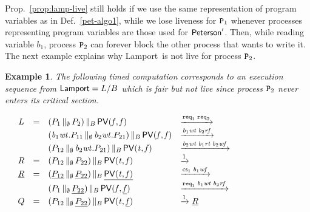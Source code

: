 \documentclass[copyright,creativecommons]{eptcs}
\newenvironment{tracex}{\ccspace{0.15}\noindent}{\ccspace{0.2}}
\newcommand{\ccspace}[1]{\vspace{#1cm}}
\newtheorem{example}[theorem]{Example}
\newcommand{\nar}[2]{\xrightarrow{#1}_{#2}}
\newcommand{\fa}{\mathit{f}}
\newcommand{\tr}{\mathit{t}}
\newcommand{\rtb}[1]{{\it b_{{\rm #1}}rt}}
\newcommand{\rfb}[1]{{\it b_{{\rm #1}}rf}}
\newcommand{\wtb}[1]{{\it b_{{\rm #1}}wt}}
\newcommand{\wfb}[1]{{\it b_{{\rm #1}}wf}}
\newcommand{\vp}{{\sf PV}}
\newcommand{\req}{{\tt req}}
\newcommand{\cs}{{\sf cs}}
\newcommand{\petersona}{{\sf Peterson}} \newcommand{\petersonb}{\petersona}
\newcommand{\lamporta}{{\sf Lamport}} \newcommand{\lamportb}{\lamporta}
\newcommand{\proc}{{\tt P}}
\newcommand{\ppath}[5]{#1 & #2 & #3 & #4 & #5}
\begin{document}
Prop.~\ref{prop:lamp-live} still holds if we use the same representation of
program variables as in Def.~\ref{pet-algo1}, while we lose liveness for
$\proc_1$ whenever processes representing program variables are those used
for $\petersona'$. Then, while reading variable $b_1$, process $\proc_2$
can forever block the other process that wants to write it. The next
example explains why \lamporta\ is not live for process $\proc_2$.
\begin{example}\rm\label{ex:lamp-1}
The following timed computation corresponds to an execution sequence from
$\lamporta = L/B$ which is fair but not live since process $\proc_2$ never
enters its critical section.

\begin{tracex}
$\begin{array}{l c c l l}
\ppath{}{L}{=}{(P_1 \,\|_{\emptyset}\, P_2) \,\|_B\, \vp(\fa,\fa)} 
{\nar{\req_1 \; \req_2  }{} } {}\\
\ppath{}{}{}{(\wtb{1}.P_{11} \,\|_{\emptyset}\, \wtb{2}.P_{21}) \,\|_B\,
\vp(\fa,\fa)} {\nar{\wtb{1} \; \rfb{2} }{} } {}\\
\ppath{}{}{}{(P_{12} \,\|_{\emptyset}\, \wtb{2}.P_{21}) \,\|_B\,
\vp(\tr,\fa)} {\nar{\wtb{2} \; \rtb{1} \; \wfb{2} }{} } {}\\
\ppath{}{R}{=}{(P_{12} \,\|_{\emptyset}\, P_{22}) \,\|_B\, \vp(\tr,\fa)}
{\nar{ 1 }{} } {}\\
\ppath{}{\underline{R}}{=}{(\underline{P_{12}} \,\|_{\emptyset}\,
\underline{P_{22}}) \,\|_B\, \underline{\vp(\tr,\fa)}} {\nar{ \cs_1 \;
\wfb{1} }{} } {}\\
\ppath{}{}{}{(P_{1} \,\|_{\emptyset}\, \underline{P_{22}}) \,\|_B\,
\vp(\fa,\underline{\fa})} {\nar{ \req_1 \; \wtb{1} \; \rfb{2} }{} } {}\\
\ppath{}{Q}{=}{(P_{12} \,\|_{\emptyset}\, \underline{P_{22}}) \,\|_B\,
\vp(\tr,\underline{\fa})} {\nar{ 1 }{} } {} \underline{R}\\
\end{array}$
\end{tracex} 


\end{example}
\end{document}
